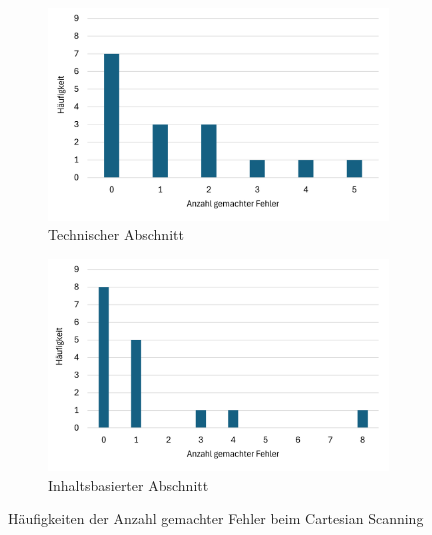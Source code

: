 \begin{figure}
    \centering
    \begin{subfigure}{.5\textwidth}
        \centering
        \includegraphics[width=0.99\textwidth]{images/Results/Histogramm-Anzahl-Fehler-technisch-cartesian.png}
        \caption{Technischer Abschnitt}
        \label{fig:anzahlFehlerCartesianTechnisch}
    \end{subfigure}%
    \begin{subfigure}{.5\textwidth}
        \centering
        \includegraphics[width=0.99\textwidth]{images/Results/Histogramm-Anzahl-Fehler-inhalt-cartesian.png}
        \caption{Inhaltsbasierter Abschnitt}
        \label{fig:anzahlFehlerCartesianInhalt}
    \end{subfigure}
    \caption{Häufigkeiten der Anzahl gemachter Fehler beim Cartesian Scanning}
    \label{fig:anzahlFehlerCartesian}
\end{figure}

